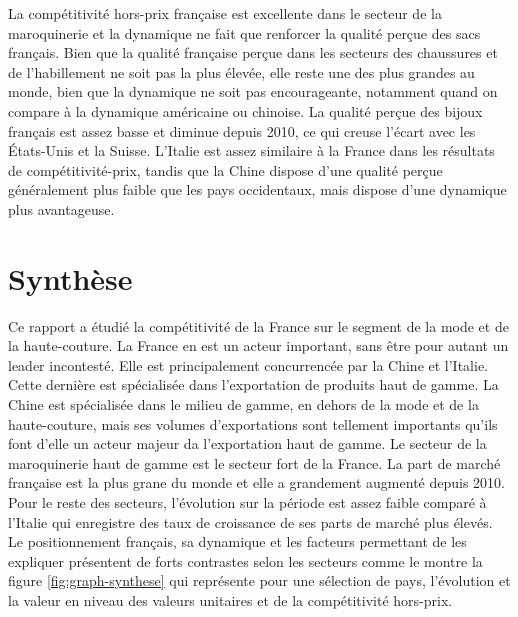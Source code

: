 \documentclass[french,10pt,a4paper]{article}
\begin{document}
La compétitivité hors-prix française est excellente dans le secteur de la maroquinerie et la dynamique ne fait que renforcer la qualité perçue des sacs français. Bien que la qualité française perçue dans les secteurs des chaussures et de l'habillement ne soit pas la plus élevée, elle reste une des plus grandes au monde, bien que la dynamique ne soit pas encourageante, notamment quand on compare à la dynamique américaine ou chinoise. La qualité perçue des bijoux français est assez basse et diminue depuis 2010, ce qui creuse l'écart avec les États-Unis et la Suisse. L'Italie est assez similaire à la France dans les résultats de compétitivité-prix, tandis que la Chine dispose d'une qualité perçue généralement plus faible que les pays occidentaux, mais dispose d'une dynamique plus avantageuse. 


\section{Synthèse}

Ce rapport a étudié la compétitivité de la France sur le segment de la mode et de la haute-couture. La France en est un  acteur important, sans être pour autant un leader incontesté. Elle est principalement concurrencée par la Chine et l'Italie. Cette dernière est spécialisée dans l'exportation de produits haut de gamme. La Chine est spécialisée dans le milieu de gamme, en dehors de la mode et de la haute-couture, mais ses volumes d'exportations sont tellement importants qu'ils font d'elle un acteur majeur da l'exportation haut de gamme. Le secteur de la maroquinerie haut de gamme est le secteur fort de la France. La part de marché française est la plus grane du monde et elle a grandement augmenté depuis 2010. Pour le reste des secteurs, l'évolution sur la période est assez faible comparé à l'Italie qui enregistre des taux de croissance de ses parts de marché plus élevés. Le positionnement français, sa dynamique et les facteurs permettant de les expliquer présentent de forts contrastes selon les secteurs comme le montre la figure \ref{fig:graph-synthese} qui représente pour une sélection de pays, l'évolution et la valeur en niveau des valeurs unitaires et de la compétitivité hors-prix. 
\end{document}

